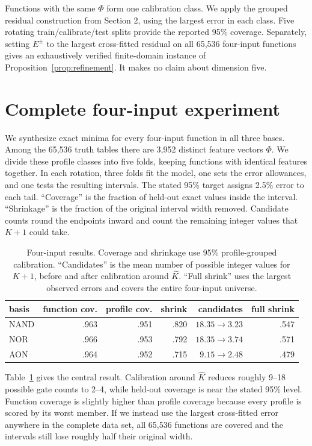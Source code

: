 \documentclass[10pt]{article}
\begin{document}
Functions with the same $\Phi$ form one calibration class.  We apply the
grouped residual construction from Section 2, using the largest error in each
class.  Five rotating train/calibrate/test splits provide the reported 95\%
coverage.  Separately, setting $E^\pm$ to the largest cross-fitted residual on
all 65,536 four-input functions gives an exhaustively verified finite-domain
instance of Proposition~\ref{prop:refinement}.  It makes no claim about
dimension five.

\FloatBarrier
\section{Complete four-input experiment}

We synthesize exact minima for every four-input function in all three bases.
Among the 65,536 truth tables there are 3,952 distinct feature vectors
$\Phi$.  We divide these profile classes into five folds, keeping functions
with identical features together.  In each rotation, three folds fit the
model, one sets the error allowances, and one tests the resulting intervals.
The stated 95\% target assigns 2.5\% error to each tail.  ``Coverage'' is the
fraction of held-out exact values inside the interval.  ``Shrinkage'' is the
fraction of the original interval width removed.  Candidate counts round the
endpoints inward and count the remaining integer values that $K+1$ could take.

\begin{table}[H]
\centering\small
\begin{tabular}{lrrrrr}
\toprule
basis & function cov. & profile cov. & shrink & candidates & full shrink\\
\midrule
NAND & .963 & .951 & .820 & $18.35\to3.23$ & .547\\
NOR  & .966 & .953 & .792 & $18.35\to3.74$ & .571\\
AON  & .964 & .952 & .715 & $9.15\to2.48$  & .479\\
\bottomrule
\end{tabular}
\caption{Four-input results. Coverage and shrinkage use 95\% profile-grouped
calibration. ``Candidates'' is the mean number of possible integer values for
$K+1$, before and after calibration around $\widehat K$. ``Full shrink'' uses
the largest observed errors and covers the entire four-input universe.}
\label{tab:n4}
\end{table}

Table~\ref{tab:n4} gives the central result.  Calibration around $\widehat K$
reduces roughly 9--18 possible gate counts to 2--4, while held-out coverage is
near the stated 95\% level.  Function coverage is slightly higher than profile
coverage because every profile is scored by its worst member.  If we instead
use the largest cross-fitted error anywhere in the complete data set, all
65,536 functions are covered and the intervals still lose roughly half their
original width.
\end{document}

